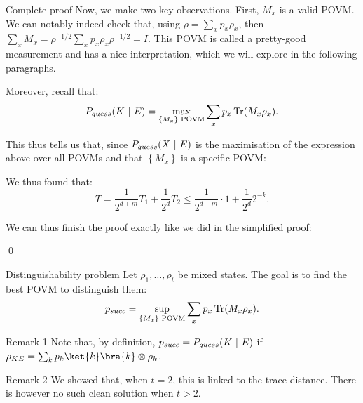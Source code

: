 \documentclass[a4paper]{article}
\begin{document}
\begin{parag}{}
\begin{subparag}{Complete proof}
        Now, we make two key observations. First, $M_x$ is a valid POVM. We can notably indeed check that, using $\rho = \sum_{x} p_x \rho_x$, then $\sum_{x} M_x = \rho^{-1/2} \sum_{x} p_x \rho_x \rho^{-1/2} = I$. This POVM is called a pretty-good measurement and has a nice interpretation, which we will explore in the following paragraphs.

        Moreover, recall that:
        \[P_{guess}\left(K \suchthat E\right) = \max_{\left\{M_x\right\} \text{ POVM}} \sum_{x} p_x \Tr\left(M_x \rho_x\right).\]

        This thus tells us that, since $P_{guess}\left(X \suchthat E\right)$ is the maximisation of the expression above over all POVMs and that $\left\{M_x\right\}$ is a specific POVM: 
        
        We thus found that: 
        \[T = \frac{1}{2^{d + m}} T_1 + \frac{1}{2^d} T_2 \leq \frac{1}{2^{d+m}}\cdot 1 + \frac{1}{2^d} 2^{-k}.\]

        We can thus finish the proof exactly like we did in the simplified proof:

        \qed
    \end{subparag}
\end{parag}

\begin{parag}{Distinguishability problem}
    Let $\rho_1, \ldots, \rho_t$ be mixed states. The goal is to find the best POVM to distinguish them: 
    \[p_{succ} = \sup_{\left\{M_x\right\} \text{ POVM}} \sum_{x} p_x \Tr\left(M_x \rho_x\right).\]

    \begin{subparag}{Remark 1}
        Note that, by definition, $p_{succ} = P_{guess}\left(K \suchthat E\right)$ if $\rho_{KE} = \sum_{k} p_k \ket{k}\bra{k} \otimes \rho_k$.
    \end{subparag}
    
    \begin{subparag}{Remark 2}
        We showed that, when $t = 2$, this is linked to the trace distance. There is however no such clean solution when $t > 2$.
    \end{subparag}
\end{parag}
\end{document}
